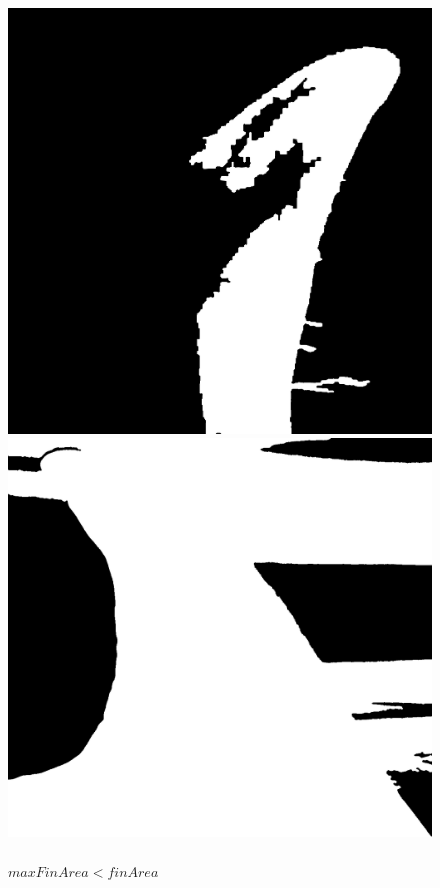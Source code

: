 \documentclass[a4paper,12pt]{report}
\begin{document}
    \begin{figure}[H]
      \centering
      \begin{minipage}{0.4\textwidth}
        \centering
        \includegraphics[width=\textwidth]{assets/images/methods/porting/quality_control/less.png}  
        \caption{\\$finArea < minFinArea$}
      \end{minipage}
      \begin{minipage}{0.4\textwidth}
        \centering
        \includegraphics[width=\textwidth]{assets/images/methods/porting/quality_control/too.png}   
        \caption{\\$maxFinArea < finArea$}
      \end{minipage}
    \end{figure}
\end{document}

